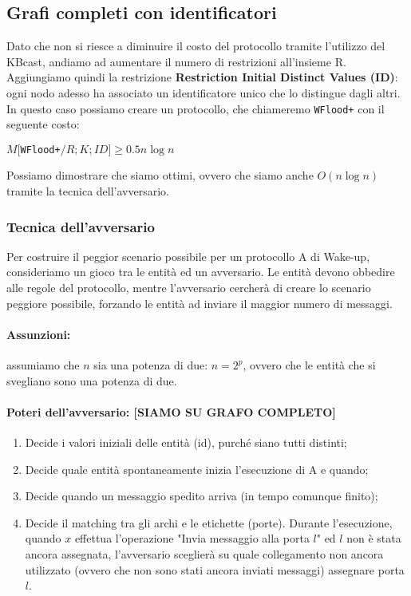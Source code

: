 \subsection{Grafi completi con identificatori}
Dato che non si riesce a diminuire il costo del protocollo tramite l'utilizzo
del KBcast, andiamo ad aumentare il numero di restrizioni all'insieme R.
Aggiungiamo quindi la restrizione \textbf{Restriction Initial Distinct Values
    (ID)}: ogni nodo adesso ha associato un identificatore unico che lo distingue
dagli altri. In questo caso possiamo creare un protocollo, che chiameremo
\texttt{WFlood+} con il seguente costo:

\begin{theorem}
    $M[$\texttt{WFlood+}$/R;K;ID] \geq 0.5n \log n$
\end{theorem}

Possiamo dimostrare che siamo ottimi, ovvero che siamo anche $O(n \log n)$
tramite la tecnica dell'avversario.

\subsubsection{Tecnica dell'avversario}
Per costruire il peggior scenario possibile per un protocollo A di Wake-up,
consideriamo un gioco tra le entità ed un avversario. Le entità devono obbedire
alle regole del protocollo, mentre l'avversario cercherà di creare lo scenario
peggiore possibile, forzando le entità ad inviare il maggior numero di messaggi.

\paragraph{Assunzioni:} assumiamo che $n$ sia una potenza di due: $n = 2^p$, ovvero
che le entità che si svegliano sono una potenza di due.

\paragraph{Poteri dell'avversario: [SIAMO SU GRAFO COMPLETO]}
\begin{enumerate}
    \item Decide i valori iniziali delle entità (id), purché siano tutti distinti;
    \item Decide quale entità spontaneamente inizia l'esecuzione di A e quando;
    \item Decide quando un messaggio spedito arriva (in tempo comunque finito);
    \item Decide il matching tra gli archi e le etichette (porte). Durante
          l'esecuzione, quando $x$ effettua l'operazione "Invia messaggio alla porta
          $l$" ed $l$ non è stata ancora assegnata, l'avversario sceglierà su quale
          collegamento non ancora utilizzato (ovvero che non sono stati ancora inviati
          messaggi) assegnare porta $l$.
\end{enumerate}

